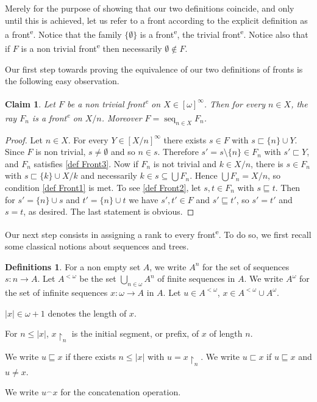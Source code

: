 \documentclass{article}%
\theoremstyle{plain}
\newtheorem{lemma}[theorem]{Properties}
\newtheorem{lemma}[theorem]{Lemma}
\newtheorem{lemma}[theorem]{Fact}
\newtheorem{lemma}[theorem]{Facts}
\newtheorem{lemma}{Claim}
\theoremstyle{definition}
\newtheorem{definition}[theorem]{Definition}
\newtheorem{definition}[theorem]{Notation}
\newtheorem{definition}[theorem]{Notations}
\newtheorem{definition}[theorem]{Definitions}
\theoremstyle{remark}
\newcommand{\ts}[1]{\textsuperscript{#1}}
\newcommand{\front}{front\ts{e}}
\newcommand{\conc}{\mathrel{{}^{\smallfrown}}} %
\newcommand{\restr}[1]{\mathord{\upharpoonright_{#1}}} %
\DeclareMathOperator*{\Seq}{\mathrm{seq}}
\DeclareMathOperator{\base}{\mathord{\bigcup}}
\newcommand{\segm} {\sqsubseteq}
\newcommand{\segs} {\sqsubset}
\newcommand{\infSub}[1]{[#1]^{\infty}}
\begin{document}
Merely for the purpose of showing that our two definitions coincide, and only until this is achieved, let us refer to a front according to the explicit definition as a \front{}. Notice that the family $\{\emptyset\}$ is a \front{}, the trivial \front{}.  Notice also that if $F$ is a non trivial \front{} then necessarily $\emptyset\notin F$.

Our first step towards proving the equivalence of our two definitions of fronts is the following easy observation.

\begin{lemma}\label{lemFrontRays}
Let $F$ be a non trivial \front{} on $X\in \infSub{\omega}$. Then for every $n\in X$, the ray $F_{n}$ is a \front{} on $X/n$. Moreover $F=\Seq_{n\in X}F_{n}$. 
\end{lemma}
\begin{proof}
Let $n\in X$. For every $Y\in\infSub{X/n}$ there exists $s\in F$ with $s\segs \{n\}\cup Y$. Since $F$ is non trivial, $s\neq\emptyset$ and so $n\in s$. Therefore $s'=s\setminus \{n\}\in F_{n}$ with $s'\segs Y$, and $F_{n}$ satisfies \cref{def Front3}. Now if $F_{n}$ is not trivial and $k\in X/n$, there is $s\in F_{n}$ with $s\segs \{k\}\cup X/k$ and necessarily $k\in s\subseteq \base F_{n}$. Hence $\base F_{n}=X/n$, so condition \cref{def Front1} is met. To see \cref{def Front2}, let $s,t\in F_{n}$ with $s\segm t$. Then for $s'=\{n\}\cup s$ and $t'=\{n\}\cup t$ we have $s',t'\in F$ and $s'\segm t'$, so $s'=t'$ and $s=t$, as desired. The last statement is obvious.
\end{proof}

Our next step consists in assigning a rank to every \front{}. To do so, we first recall some classical notions about sequences and trees.

\begin{definition}
For a non empty set $A$, we write $A^{n}$ for the set of sequences $s:n\to A$. Let $A^{<\omega}$ be the set $\bigcup_{n\in\omega} A^{n}$ of finite sequences in $A$. We write $A^{\omega}$ for the set of infinite sequences $x:\omega \to A$ in $A$. Let $u\in A^{<\omega}$, $x\in A^{<\omega}\cup A^{\omega}$.
\begin{enumDefn}
\item $|x|\in \omega+1$ denotes the length of $x$.
\item For $n\leq |x|$, $x\restr{n}$ is the initial segment, or prefix, of $x$ of length $n$.
\item  We write $u\segm x$ if there exists $n\leq |x|$ with $u=x\restr{n}$. We write $u\segs x$ if $u\segm x$ and $u\neq x$.
\item We write $u\conc x$ for the concatenation operation.
\end{enumDefn}
\end{definition}
\end{document}
